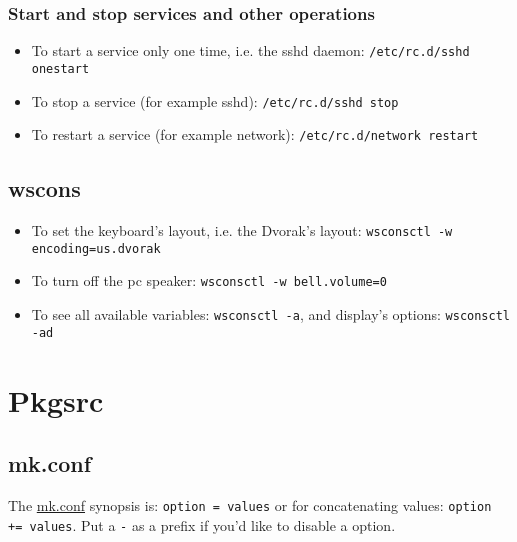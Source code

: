 \documentclass[notumble]{leaflet}
\begin{document}
\subsubsection{Start and stop services and other operations}
\begin{itemize}
\item To start a service only one time, i.e. the \mbox{sshd} daemon: 
\verb|/etc/rc.d/sshd onestart|
\item To stop a service (for example \mbox{sshd}): 
\verb|/etc/rc.d/sshd stop|
\item To restart a service (for example \mbox{network}): 
\verb|/etc/rc.d/network restart|
\end{itemize}

\subsection{wscons}
\begin{itemize}
\item To set the keyboard's layout, i.e. the Dvorak's layout: 
\verb|wsconsctl -w encoding=us.dvorak|
\item To turn off the pc speaker: \verb|wsconsctl -w bell.volume=0|
\item To see all available variables: \verb|wsconsctl -a|,
and display's options: \verb|wsconsctl -ad|
\end{itemize}


\section{Pkgsrc}
\subsection{mk.conf}
The \url{mk.conf} synopsis is: \verb|option = values| or for concatenating
values:
\verb|option += values|. Put a \verb|-| as a prefix if you'd like to disable a
option.
\end{document}
